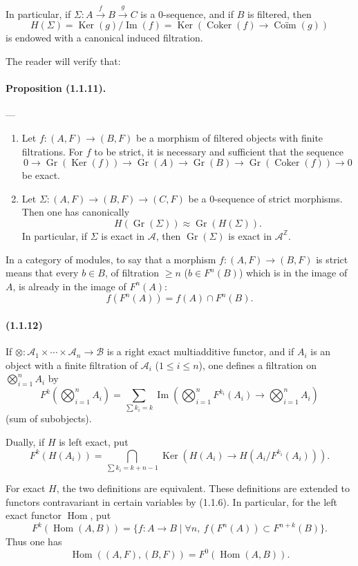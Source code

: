 \documentclass[10pt]{article}
\newcommand{\Z}{\mathbb Z}
\newcommand{\Gr}{\operatorname{Gr}}
\newcommand{\Ker}{\operatorname{Ker}}
\newcommand{\Coker}{\operatorname{Coker}}
\newcommand{\Imop}{\operatorname{Im}}
\newcommand{\Hom}{\operatorname{Hom}}
\newcommand{\calA}{\mathcal A}
\newcommand{\calB}{\mathcal B}
\begin{document}
In particular, if $\Sigma:A\xrightarrow{f}B\xrightarrow{g}C$ is a $0$-sequence, and if $B$ is filtered, then
\[
H(\Sigma)=\Ker(g)/\Imop(f)=\Ker(\Coker(f)\to\operatorname{Coïm}(g))
\]
is endowed with a canonical induced filtration.

The reader will verify that:

\paragraph{Proposition (1.1.11).} --- \begin{enumerate}[label=(\roman*)]
\item Let $f:(A,F)\to(B,F)$ be a morphism of filtered objects with finite filtrations. For $f$ to be strict, it is necessary and sufficient that the sequence
\[
0\to\Gr(\Ker(f))\to\Gr(A)\to\Gr(B)\to\Gr(\Coker(f))\to0
\]
be exact.
\item Let $\Sigma:(A,F)\to(B,F)\to(C,F)$ be a $0$-sequence of strict morphisms. Then one has canonically
\[
H(\Gr(\Sigma))\approx\Gr(H(\Sigma)).
\]
In particular, if $\Sigma$ is exact in $\calA$, then $\Gr(\Sigma)$ is exact in $\calA^{\Z}$.
\end{enumerate}

In a category of modules, to say that a morphism $f:(A,F)\to(B,F)$ is strict means that every $b\in B$, of filtration $\ge n$ ($b\in F^n(B)$) which is in the image of $A$, is already in the image of $F^n(A)$:
\[
f(F^n(A))=f(A)\cap F^n(B).
\]

\paragraph{(1.1.12)} If $\otimes:\calA_1\times\cdots\times\calA_n\to\calB$ is a right exact multiadditive functor, and if $A_i$ is an object with a finite filtration of $\calA_i$ ($1\le i\le n$), one defines a filtration on $\bigotimes_{i=1}^nA_i$ by
\[
F^k\left(\bigotimes_{i=1}^n A_i\right)=\sum_{\sum k_i=k}\Imop\left(\bigotimes_{i=1}^n F^{k_i}(A_i)\to\bigotimes_{i=1}^n A_i\right)
\]
(sum of subobjects).

Dually, if $H$ is left exact, put
\[
F^k(H(A_i))=\bigcap_{\sum k_i=k+n-1}\Ker\left(H(A_i)\to H(A_i/F^{k_i}(A_i))\right).
\]

For exact $H$, the two definitions are equivalent. These definitions are extended to functors contravariant in certain variables by (1.1.6). In particular, for the left exact functor $\Hom$, put
\[
F^k(\Hom(A,B))=\{f:A\to B\mid \forall n,\ f(F^n(A))\subset F^{n+k}(B)\}.
\]
Thus one has
\[
\Hom((A,F),(B,F))=F^0(\Hom(A,B)).
\]
\end{document}
